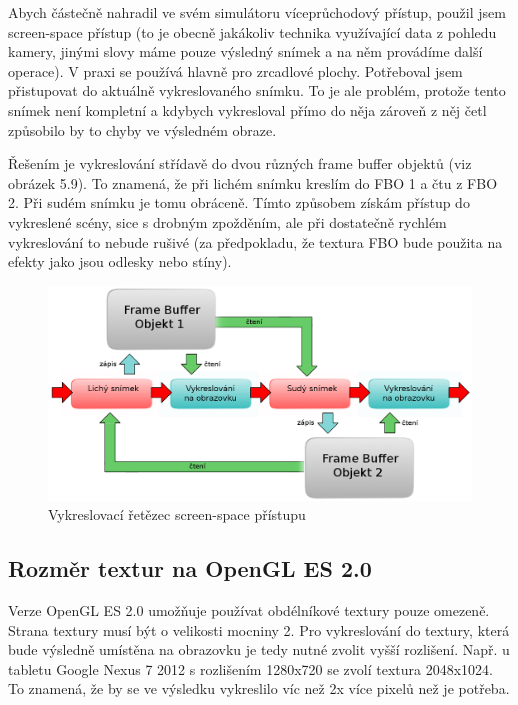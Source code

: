 \documentclass[11pt,twoside,a4paper]{book}
\begin{document}
Abych částečně nahradil ve svém simulátoru víceprůchodový přístup, použil jsem screen-space přístup (to je obecně jakákoliv technika využívající data z pohledu kamery, jinými slovy máme pouze výsledný snímek a na něm provádíme další operace). V praxi se používá hlavně pro zrcadlové plochy. Potřeboval jsem přistupovat do aktuálně vykreslovaného snímku. To je ale problém, protože tento snímek není kompletní a kdybych vykresloval přímo do něj\linebreak a zároveň z něj četl způsobilo by to chyby ve výsledném obraze.

Řešením je vykreslování střídavě do dvou různých frame buffer objektů (viz obrázek 5.9). To znamená, že při lichém snímku kreslím do FBO 1 a čtu z FBO 2. Při sudém snímku je tomu obráceně. Tímto způsobem získám přístup do vykreslené scény, sice s drobným zpožděním, ale při dostatečně rychlém vykreslování to nebude rušivé (za předpokladu, že textura FBO bude použita na efekty jako jsou odlesky nebo stíny).

\begin{center}
\begin{figure}[h!]
\includegraphics[width=140mm]{figures/screenspace.png}
\caption{Vykreslovací řetězec screen-space přístupu}
\end{figure}
\end{center}

\subsection{Rozměr textur na OpenGL ES 2.0}
Verze OpenGL ES 2.0 umožňuje používat obdélníkové textury pouze omezeně. Strana textury musí být o velikosti mocniny 2.
Pro vykreslování do textury, která bude výsledně umístěna na obrazovku je tedy nutné zvolit vyšší rozlišení. Např. u tabletu Google Nexus 7 2012 s rozlišením 1280x720 se zvolí textura 2048x1024. To znamená, že by se ve výsledku vykreslilo víc než 2x více pixelů než je potřeba.
\end{document}
